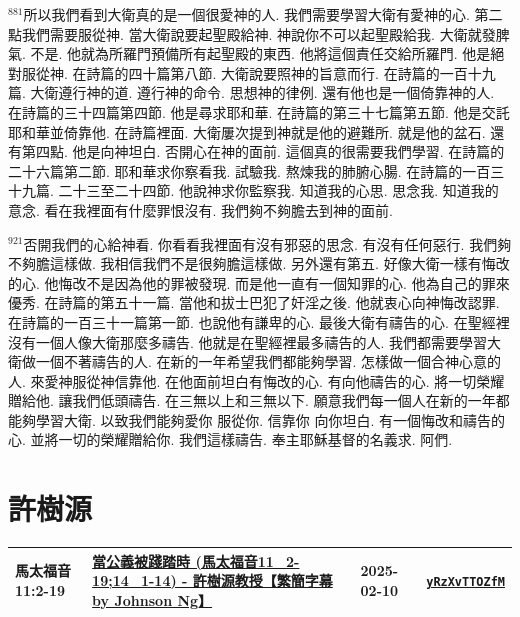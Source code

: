 \documentclass{book}
\begin{document}
$^{881}$所以我們看到大衛真的是一個很愛神的人.
我們需要學習大衛有愛神的心.
第二點我們需要服從神.
當大衛說要起聖殿給神.
神說你不可以起聖殿給我.
大衛就發脾氣.
不是.
他就為所羅門預備所有起聖殿的東西.
他將這個責任交給所羅門.
他是絕對服從神.
在詩篇的四十篇第八節.
大衛說要照神的旨意而行.
在詩篇的一百十九篇.
大衛遵行神的道.
遵行神的命令.
思想神的律例.
還有他也是一個倚靠神的人.
在詩篇的三十四篇第四節.
他是尋求耶和華.
在詩篇的第三十七篇第五節.
他是交託耶和華並倚靠他.
在詩篇裡面.
大衛屢次提到神就是他的避難所.
就是他的盆石.
還有第四點.
他是向神坦白.
否開心在神的面前.
這個真的很需要我們學習.
在詩篇的二十六篇第二節.
耶和華求你察看我.
試驗我.
熬煉我的肺腑心腸.
在詩篇的一百三十九篇.
二十三至二十四節.
他說神求你監察我.
知道我的心思.
思念我.
知道我的意念.
看在我裡面有什麼罪恨沒有.
我們夠不夠膽去到神的面前.

$^{921}$否開我們的心給神看.
你看看我裡面有沒有邪惡的思念.
有沒有任何惡行.
我們夠不夠膽這樣做.
我相信我們不是很夠膽這樣做.
另外還有第五.
好像大衛一樣有悔改的心.
他悔改不是因為他的罪被發現.
而是他一直有一個知罪的心.
他為自己的罪來優秀.
在詩篇的第五十一篇.
當他和拔士巴犯了奸淫之後.
他就衷心向神悔改認罪.
在詩篇的一百三十一篇第一節.
也說他有謙卑的心.
最後大衛有禱告的心.
在聖經裡沒有一個人像大衛那麼多禱告.
他就是在聖經裡最多禱告的人.
我們都需要學習大衛做一個不著禱告的人.
在新的一年希望我們都能夠學習.
怎樣做一個合神心意的人.
來愛神服從神信靠他.
在他面前坦白有悔改的心.
有向他禱告的心.
將一切榮耀贈給他.
讓我們低頭禱告.
在三無以上和三無以下.
願意我們每一個人在新的一年都能夠學習大衛.
以致我們能夠愛你 服從你.
信靠你 向你坦白.
有一個悔改和禱告的心.
並將一切的榮耀贈給你.
我們這樣禱告.
奉主耶穌基督的名義求.
阿們.
\newpage



\chapter{許樹源}\label{ch:preacher12}
\begin{multicols}{3}
\minitoc
\end{multicols}
{ \scriptsize


\begin{xltabular}{\textwidth}{|p{0.15\textwidth} p{0.6\textwidth}|p{0.07\textwidth} p{0.1\textwidth}|}
\hline
馬太福音 11:2-19 & \hyperref[sec:yRzXvTTOZfM]{當公義被踐踏時  (馬太福音11\_2-19;14\_1-14) - 許樹源教授【繁簡字幕 by Johnson Ng】} & 2025-02-10 & \href{https://youtube.com/watch?v=yRzXvTTOZfM}{\texttt{yRzXvTTOZfM}} \\
\hline
\end{xltabular}
}
\newpage
\end{document}
